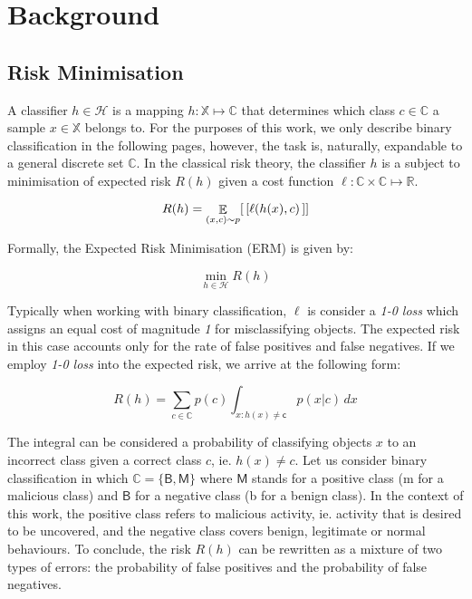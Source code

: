 \section{Background}

\subsection{Risk Minimisation}

A classifier $h \in \mathcal{H}$ is a mapping
$h: \mathbb{X} \mapsto \mathbb{C}$ that determines which class
$c \in \mathbb{C}$ a sample $x \in \mathbb{X}$ belongs to. For the
purposes of this work, we only describe binary classification in the
following pages, however, the task is, naturally, expandable to a
general discrete set $\mathbb{C}$. In the classical risk theory, the
classifier $h$ is a subject to minimisation of expected risk $R(h)$
given a cost function
$\ell: \mathbb{C} \times \mathbb{C} \mapsto \mathbb{R}$.

\begin{equation}\label{eq:empirical-risk-minimisation}
R(h) = \mathop{\mathbb{E}}_{(x,c) \sim p} [\,[ \ell(h(x), c) \,]]
\end{equation}

Formally, the Expected Risk Minimisation (ERM) is given by:

\begin{equation}
\min_{h \in \mathcal{H}} R(h)
\end{equation}

Typically when working with binary classification, $\ell$ is consider
a \emph{1-0 loss} which assigns an equal cost of magnitude \emph{1} for
misclassifying objects. The expected risk in this case accounts only for
the rate of false positives and false negatives. If we employ \emph{1-0
loss} into the expected risk, we arrive at the following form:

\begin{equation}
R(h) = \sum_{c \in \mathbb{C}} p(c) \int_{x: h(x) \neq \mathsf{c}} p(x|c) \,  dx
\end{equation}

The integral can be considered a probability of classifying objects
$x$ to an incorrect class given a correct class $c$, ie.
$h(x) \neq c$. Let us consider binary classification in which
$\mathbb{C} = \{ \mathsf{B}, \mathsf{M} \}$ where $\mathsf{M}$
stands for a positive class (m for a malicious class) and $\mathsf{B}$
for a negative class (b for a benign class). In the context of this
work, the positive class refers to malicious activity, ie. activity that
is desired to be uncovered, and the negative class covers benign,
legitimate or normal behaviours. To conclude, the risk $R(h)$ can be
rewritten as a mixture of two types of errors: the probability of false
positives and the probability of false negatives.

